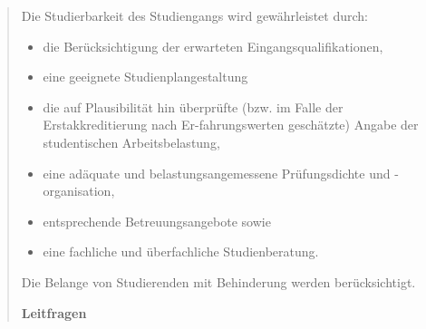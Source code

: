 \begin{quote}
Die Studierbarkeit des Studiengangs wird gewährleistet durch:

\begin{itemize}
\tightlist
\item
  die Berücksichtigung der erwarteten Eingangsqualifikationen,
\item
  eine geeignete Studienplangestaltung
\item
  die auf Plausibilität hin überprüfte (bzw. im Falle der
  Erstakkreditierung nach Er-fahrungswerten geschätzte) Angabe der
  studentischen Arbeitsbelastung,
\item
  eine adäquate und belastungsangemessene Prüfungsdichte und
  -organisation,
\item
  entsprechende Betreuungsangebote sowie
\item
  eine fachliche und überfachliche Studienberatung.
\end{itemize}

Die Belange von Studierenden mit Behinderung werden berücksichtigt.

\textbf{Leitfragen}


\end{quote}
